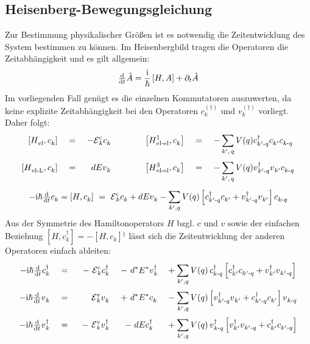 \documentclass[a4paper,11pt, twoside]{article}
\newcommand{\ind}[2]{{_{#1}^{#2}}}
\newcommand{\+}{\dagger}
\newcommand{\E}{\mathcal{E}}
\newcommand{\dt}[1]{\tfrac{\tt d #1}{\tt d t}}
\renewcommand{\^}{\hat}
\renewcommand{\tt}{\text}
\renewcommand{\~}{\widetilde}
\begin{document}
\subsection{Heisenberg-Bewegungsgleichung}
Zur Bestimmung physikalischer Größen ist es notwendig die Zeitentwicklung des System bestimmen zu können. Im Heisenbergbild tragen die Operatoren die Zeitabhängigkeit und es gilt allgemein: 
\begin{align*}
\dt{} \^A  = \frac{\tt i}{\hbar}\left [H,A\right ] + \partial_t \^{A}
\end{align*}
Im vorliegenden Fall genügt es die einzelnen Kommutatoren auszuwerten, da keine explizite Zeitabhängigkeit bei den Operatoren $c\ind{k}{(\+)}$ und  $v\ind{k}{(\+)}$ vorliegt. Daher folgt:
\begin{alignat*}{7}
\left [H\ind{\tt{el}}{},c\ind{k}{}\right ]   && \ = \ &&-\E \ind{k}{\tt c} c\ind{k}{} && \qquad &&
 \left [H\ind{\tt{el-el}}{1},c\ind{k}{}\right ]  &&\ =\ && -\sum_{k',\,q} \,&V(q)c\ind{k'\tt -q}{\+}c\ind{k'}{}c\ind{k\tt -q}{} \\
\left [H\ind{\tt{el-L}}{},c\ind{k}{}\right ]  &&\ =\ && dE v\ind{k}{} && \qquad &&
\left [H\ind{\tt{el-el}}{3},c\ind{k}{}\right ]  &&\ =\ && -\sum_{k',\,q}^{}\, &V(q)v\ind{k'\tt-q}{\+}v\ind{k'}{}c\ind{k\tt -q}{}
\end{alignat*} 
\[ 	-\tt i\hbar\dt{} c\ind{k}{}  =  \left [H,c\ind{k}{}\right ] \ = \  \E \ind{k}{\tt c}c\ind{k}{}+dEv\ind{k}{} - \sum_{k',q}^{} V(q)\left [c\ind{k'\tt -q}{\+}c\ind{k'}{}+v\ind{k'\tt-q}{\+}v\ind{k'}{}\right ]c\ind{k\tt -q}{} 		\]
Aus der Symmetrie des Hamiltonoperators $H$ bzgl. $c$ und $v$ sowie der einfachen Beziehung $[H,c\ind{k}{\+}]=-[H,c\ind{k}{}]\ind{}{\+}$ lässt sich die Zeitentwicklung der anderen Operatoren einfach ableiten: 
\begin{alignat*}{5}
-\tt i\hbar\dt{} c\ind{k}{\+}   &&\ =\ && \ - \ \E \ind{k}{\tt c}c\ind{k}{\+} && \ -\  d^*&E^*v\ind{k}{\+} &&+ \sum_{k',q}^{} V(q)\, c\ind{k\tt -q}{\+}\left [c\ind{k'}{\+}c\ind{k'\tt -q}{}+v\ind{k'}{\+}v\ind{k'\tt-q}{}\right ] \\
-\tt i\hbar\dt{} v\ind{k}{}  && \ = \  &&  \E \ind{k}{\tt v}v\ind{k}{}    &&\ +\  d^*&E^* c\ind{k}{}  &&- \sum_{k',q}^{} V(q)\left [v\ind{k'\tt -q}{\+}v\ind{k'}{}+c\ind{k'\tt-q}{\+}c\ind{k'}{}\right ]v\ind{k\tt -q}{} \\ 
-\tt i\hbar\dt{} v\ind{k}{\+}   &&\ =\ && \ -\ \E \ind{k}{\tt v}v\ind{k}{\+} && \ -\ d&Ec\ind{k}{\+} &&+ \sum_{k',q}^{} V(q)\, v\ind{k\tt -q}{\+}\left [v\ind{k'}{\+}v\ind{k'\tt -q}{}+c\ind{k'}{\+}c\ind{k'\tt-q}{}\right ]
\end{alignat*}
\end{document}
